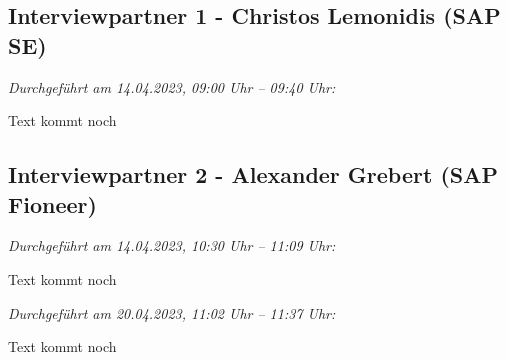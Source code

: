 \subsection{Interviewpartner 1 - Christos Lemonidis (SAP SE)}

\textit{Durchgeführt am 14.04.2023, 09:00 Uhr -- 09:40 Uhr:}

Text kommt noch

\newpage

\subsection{Interviewpartner 2 - Alexander Grebert (SAP Fioneer)}

\textit{Durchgeführt am 14.04.2023, 10:30 Uhr -- 11:09 Uhr:}

Text kommt noch 


\textit{Durchgeführt am 20.04.2023, 11:02 Uhr -- 11:37 Uhr:}

Text kommt noch

\newpage


